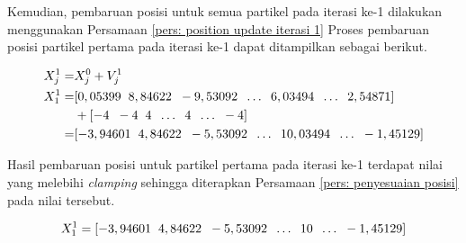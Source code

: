 {{\begin{enumerate}[align = left, left = 0cm, nolistsep]
              Kemudian, pembaruan posisi untuk semua partikel pada iterasi ke-1 dilakukan menggunakan Persamaan \ref{pers: position update iterasi 1}
              Proses pembaruan posisi partikel pertama pada iterasi ke-1 dapat ditampilkan sebagai berikut.


                  {%
                      \begin{equation*}
                          \begin{aligned}
                              X_{j}^{1}  = & X_{j}^{0}+V_{j}^{1}                                                                                                                \\
                              X_{1}^{1}  = & [0,05399\hspace{2mm}	8,84622\hspace{2mm}	-9,53092\hspace{2mm} \dots\hspace{2mm} 6,03494\hspace{2mm} \dots \hspace{2mm} 2,54871]    \\
                                           & + [-4\hspace{2mm} -4\hspace{2mm} 4\hspace{2mm} \dots\hspace{2mm} 4\hspace{2mm} \dots\hspace{2mm} -4]                               \\
                              =            & [-3,94601\hspace{2mm} 4,84622\hspace{2mm} -5,53092\hspace{2mm} \dots \hspace{2mm} 10,03494\hspace{2mm} \dots\hspace{2mm} -1,45129]
                          \end{aligned}
                      \end{equation*}
                  }

              Hasil pembaruan posisi untuk partikel pertama pada iterasi ke-1 terdapat nilai yang melebihi \textit{clamping} sehingga diterapkan Persamaan \ref{pers: penyesuaian posisi} pada nilai tersebut.

              \begin{equation*}
                  X_{1}^{1} = [-3,94601\hspace{2mm} 4,84622\hspace{2mm} -5,53092\hspace{2mm} \dots \hspace{2mm} 10\hspace{2mm} \dots\hspace{2mm} -1,45129]
              \end{equation*}


\end{enumerate}}}
